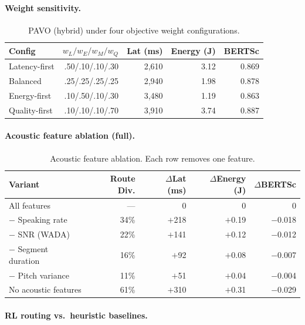 \documentclass{article}
\begin{document}
\paragraph{Weight sensitivity.}

\begin{table}[H]
\centering
\caption{PAVO (hybrid) under four objective weight configurations.}
\label{tab:weights}
\small
\begin{tabular}{lrrrr}
\toprule
Config & $w_L/w_E/w_M/w_Q$ & Lat (ms) & Energy (J) & BERTSc \\
\midrule
Latency-first  & .50/.10/.10/.30 & 2{,}610 & 3.12 & 0.869 \\
Balanced       & .25/.25/.25/.25 & 2{,}940 & 1.98 & 0.878 \\
Energy-first   & .10/.50/.10/.30 & 3{,}480 & 1.19 & 0.863 \\
Quality-first  & .10/.10/.10/.70 & 3{,}910 & 3.74 & 0.887 \\
\bottomrule
\end{tabular}
\end{table}

\paragraph{Acoustic feature ablation (full).}

\begin{table}[H]
\centering
\caption{Acoustic feature ablation. Each row removes one feature.}
\label{tab:ablation_acoustic}
\small
\begin{tabular}{lrrrr}
\toprule
Variant & Route Div. & $\Delta$Lat (ms) & $\Delta$Energy (J) & $\Delta$BERTSc \\
\midrule
All features     & --- & 0 & 0 & 0 \\
$-$ Speaking rate       & 34\% & $+$218 & $+$0.19 & $-$0.018 \\
$-$ SNR (WADA)          & 22\% & $+$141 & $+$0.12 & $-$0.012 \\
$-$ Segment duration    & 16\% & $+$92  & $+$0.08 & $-$0.007 \\
$-$ Pitch variance      & 11\% & $+$51  & $+$0.04 & $-$0.004 \\
No acoustic features    & 61\% & $+$310 & $+$0.31 & $-$0.029 \\
\bottomrule
\end{tabular}
\end{table}

\paragraph{RL routing vs.\ heuristic baselines.}
\end{document}
